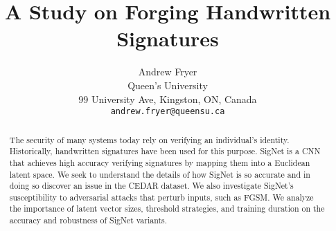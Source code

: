 \documentclass[final]{cvpr}
\begin{document}
\title{A Study on Forging Handwritten Signatures}

\author{Andrew Fryer\\
Queen's University\\
99 University Ave, Kingston, ON, Canada\\
{\tt\small andrew.fryer@queensu.ca}
}

\maketitle


\begin{abstract}
   The security of many systems today rely on verifying an individual's identity.
   Historically, handwritten signatures have been used for this purpose.
   SigNet is a CNN that achieves high accuracy verifying signatures by mapping them into a Euclidean latent space.
   We seek to understand the details of how SigNet is so accurate and in doing so discover an issue in the CEDAR dataset.
   We also investigate SigNet's susceptibility to adversarial attacks that perturb inputs, such as FGSM.
   We analyze the importance of latent vector sizes, threshold strategies, and training duration on the accuracy and robustness of SigNet variants.

% 
\end{abstract}













{\small


}
\end{document}
